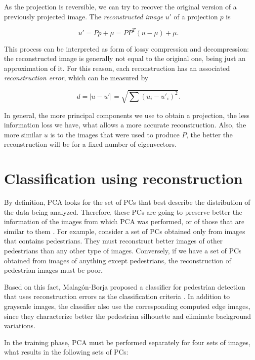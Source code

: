 \documentclass[10pt, conference, compsocconf]{IEEEtran}
\begin{document}
\noindent As the projection is reversible, we can try to recover the original version of a previously projected image. The \emph{reconstructed image} $u'$ of a projection $p$ is

\begin{equation}
  u' = Pp + \mu = PP^T(u - \mu) + \mu.
\end{equation}

\noindent This process can be interpreted as form of lossy compression and decompression: the reconstructed image is generally not equal to the original one, being just an approximation of it. For this reason, each reconstruction has an associated \emph{reconstruction error}, which can be measured by

\begin{equation}
  d = |u - u'| = \sqrt{\sum{(u_i - u'_i)^2}}.
\end{equation}

In general, the more principal components we use to obtain a projection, the less information loss we have, what allows a more accurate reconstruction. Also, the more similar $u$ is to the images that were used to produce $P$, the better the reconstruction will be for a fixed number of eigenvectors.


\section{Classification using reconstruction}

By definition, PCA looks for the set of PCs that best describe the distribution of the data being analyzed. Therefore, these PCs are going to preserve better the information of the images from which PCA was performed, or of those that are similar to them \cite{borja09}. For example, consider a set of PCs obtained only from images that contains pedestrians. They must reconstruct better images of other pedestrians than any other type of images. Conversely, if we have a set of PCs obtained from images of anything except pedestrians, the reconstruction of pedestrian images must be poor.

Based on this fact, Malagón-Borja proposed a classifier for pedestrian detection that uses reconstruction errors as the classification criteria \cite{borja09}. In addition to grayscale images, the classifier also use the corresponding computed edge images, since they characterize better the pedestrian silhouette and eliminate background variations. 

In the training phase, PCA must be performed separately for four sets of images, what results in the following sets of PCs:
\end{document}
